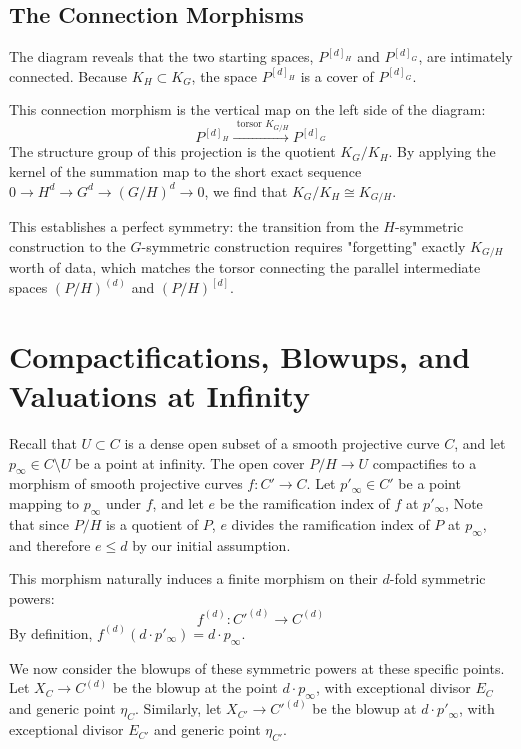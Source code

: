 \subsection*{The Connection Morphisms}

The diagram reveals that the two starting spaces, $P^{[d]_H}$ and $P^{[d]_G}$, are intimately connected. Because $K_H \subset K_G$, the space $P^{[d]_H}$ is a cover of $P^{[d]_G}$. 

This connection morphism is the vertical map on the left side of the diagram:
\[
P^{[d]_H} \xrightarrow{\text{ torsor } K_{G/H}} P^{[d]_G}
\]
The structure group of this projection is the quotient $K_G / K_H$. By applying the kernel of the summation map to the short exact sequence $0 \to H^d \to G^d \to (G/H)^d \to 0$, we find that $K_G / K_H \cong K_{G/H}$. 

This establishes a perfect symmetry: the transition from the $H$-symmetric construction to the $G$-symmetric construction requires "forgetting" exactly $K_{G/H}$ worth of data, which matches the torsor connecting the parallel intermediate spaces $(P/H)^{(d)}$ and $(P/H)^{[d]}$.


\section*{Compactifications, Blowups, and Valuations at Infinity}

Recall that $U \subset C$ is a dense open subset of a smooth projective curve $C$, and let $p_\infty \in C \setminus U$ be a point at infinity. The open cover $P/H \to U$ compactifies to a morphism of smooth projective curves $f: C' \to C$. Let $p'_\infty \in C'$ be a point mapping to $p_\infty$ under $f$, and let $e$ be the ramification index of $f$ at $p'_\infty$, Note that since $P/H$ is a quotient of $P$, $e$ divides the ramification index of $P$ at $p_\infty$, and therefore $e \leq d$ by our initial assumption.

This morphism naturally induces a finite morphism on their $d$-fold symmetric powers:
\[
f^{(d)}: C'^{(d)} \to C^{(d)}
\]
By definition, $f^{(d)}(d \cdot p'_\infty) = d \cdot p_\infty$. 

We now consider the blowups of these symmetric powers at these specific points. Let $X_C \to C^{(d)}$ be the blowup at the point $d \cdot p_\infty$, with exceptional divisor $E_C$ and generic point $\eta_C$. Similarly, let $X_{C'} \to C'^{(d)}$ be the blowup at $d \cdot p'_\infty$, with exceptional divisor $E_{C'}$ and generic point $\eta_{C'}$.

